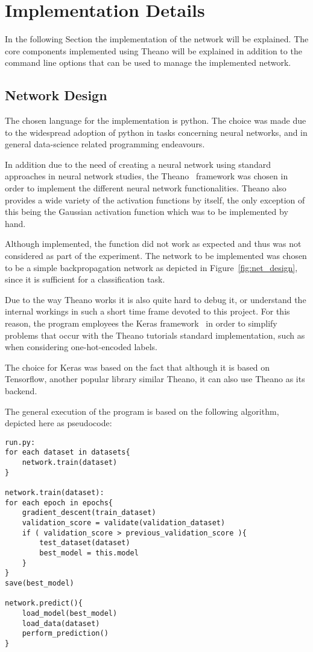 \documentclass[12pt]{article}
\begin{document}
\section{Implementation Details}
\label{sec:implementation_details}

In the following Section the implementation of the network will be explained. The core components implemented using Theano will be explained in addition to the command line options that can be used to manage the implemented network.

\subsection{Network Design}
\label{sub:network_design}

The chosen language for the implementation is python. The choice was made due to the widespread adoption of python in tasks concerning neural networks, and in general data-science related programming endeavours. 

In addition due to the need of creating a neural network using standard approaches in neural network studies, the Theano~\citep{theanoTutorial} framework was chosen in order to implement the different neural network functionalities. Theano also provides a wide variety of the activation functions by itself, the only exception of this being the Gaussian activation function which was to be implemented by hand. 

Although implemented, the function did not work as expected and thus was not considered as part of the experiment.  The network to be implemented was chosen to be a simple backpropagation network as depicted in Figure~\ref{fig:net_design}, since it is sufficient for a classification task.

Due to the way Theano works it is also quite hard to debug it, or understand the internal workings in such a short time frame devoted to this project. For this reason, the program employees the Keras framework~\citep{keras} in order to simplify problems that occur with the Theano tutorials standard implementation, such as when considering one-hot-encoded labels.

The choice for Keras was based on the fact that although it is based on Tensorflow, another popular library similar Theano, it can also use Theano as its backend.

The general execution of the program is based on the following algorithm, depicted here as pseudocode:
\begin{lstlisting}
run.py:
for each dataset in datasets{
    network.train(dataset)    
}    

network.train(dataset):
for each epoch in epochs{
    gradient_descent(train_dataset)
    validation_score = validate(validation_dataset)
    if ( validation_score > previous_validation_score ){
        test_dataset(dataset)
        best_model = this.model
    }
}
save(best_model)

network.predict(){
    load_model(best_model)
    load_data(dataset)
    perform_prediction()
}
\end{lstlisting}
\end{document}
